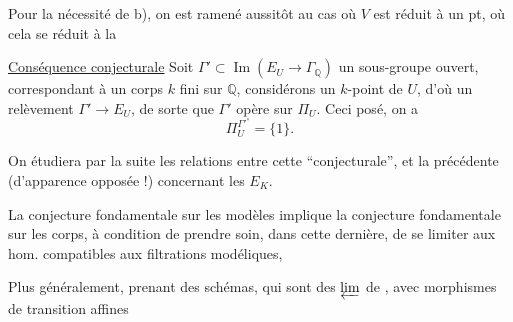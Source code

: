 Pour la nécessité de b), on est ramené aussitôt au cas où $V$ est réduit à un pt, où cela se réduit à la 

\uline{Conséquence conjecturale} Soit $\Gamma'\subset\operatorname{Im}(E_U\longrightarrow\Gamma_{\mathbb{Q}})$ un sous-groupe ouvert, correspondant à un corps $k$ fini sur $\mathbb{Q}$, considérons un $k$-point de $U$, d'où un relèvement $\Gamma'\longrightarrow E_U$, de sorte que $\Gamma'$ opère sur $\Pi_U$. Ceci posé, on a
\[
\Pi_U^{\Gamma'^\circ}=\{1\}.
\]

On étudiera par la suite les relations entre cette  ``conjecturale'', et la précédente (d'apparence opposée !) concernant les $E_K$.

La conjecture fondamentale sur les modèles implique la conjecture fondamentale sur les corps, à condition de prendre soin, dans cette dernière, de se limiter aux hom. compatibles aux filtrations modéliques,

Plus généralement, prenant  des schémas,  qui sont des $\varprojlim$ de   , avec morphismes de transition  affines
